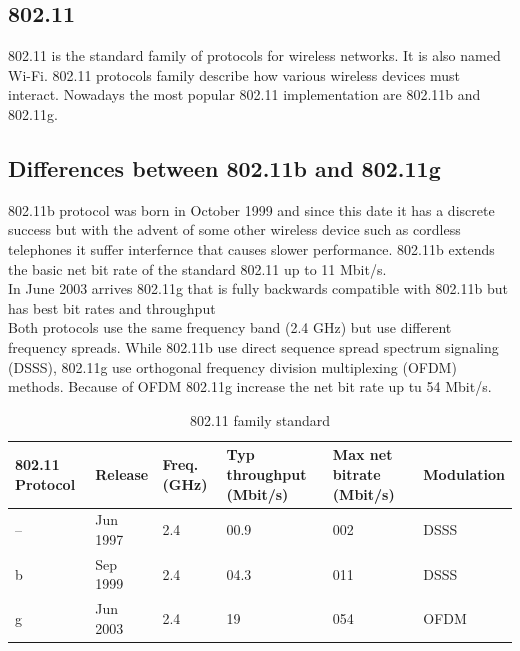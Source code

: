 	\subsection{802.11} \label{theory:prot_specs}
	802.11 is the standard family of protocols for wireless networks. It is also named Wi-Fi. 802.11 protocols family describe how various wireless devices must interact. Nowadays the most popular 802.11 implementation are 802.11b and 802.11g.
	
	\subsection{Differences between 802.11b and 802.11g} \label{theory:prot_differences}
	
	802.11b protocol was born in October 1999 and since this date it has a discrete success but with the advent of some other wireless device such as cordless telephones it suffer interfernce that causes slower performance. 802.11b extends the basic net bit rate of the standard 802.11 up to 11 Mbit/s.\\
	
	In June 2003 arrives 802.11g that is fully backwards compatible with 802.11b but has best bit rates and throughput\\
	Both protocols use the same frequency band (2.4 GHz) but use different frequency spreads. While 802.11b use direct sequence spread spectrum signaling (DSSS), 802.11g use orthogonal frequency division multiplexing (OFDM) methods. Because of OFDM 802.11g increase the net bit rate up tu 54 Mbit/s.
	
	\begin{table}[h]
		
		\begin{tabularx}{15cm}{ | X X X X X X | }
			\hline
				802.11 Protocol & Release & Freq. (GHz) & Typ throughput (Mbit/s) & Max net bitrate (Mbit/s) & Modulation \\
			\hline
				-- & Jun 1997 & 2.4 & 00.9 & 002 & DSSS \\
				b & Sep 1999 & 2.4 & 04.3 & 011 & DSSS \\
				g & Jun 2003 & 2.4 & 19 & 054 & OFDM \\
			\hline
		\end{tabularx}
		
		\caption{802.11 family standard}
		\label{802.11_family_standard}
	\end{table}
	
